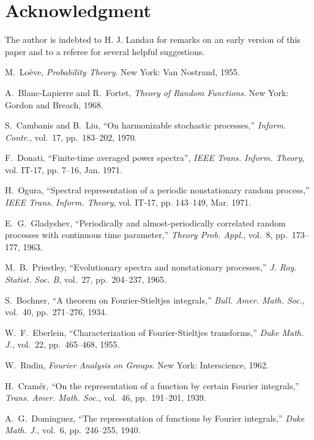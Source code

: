 \documentclass[11pt]{article}
\theoremstyle{plain}
\theoremstyle{definition}
\theoremstyle{remark}
\begin{document}
\section*{Acknowledgment}

The author is indebted to H. J. Landau for remarks on an early version of this paper and to a referee for several helpful suggestions.

\begin{thebibliography}{12}
M.~Loève, \emph{Probability Theory}. New York: Van Nostrand, 1955.

A.~Blanc-Lapierre and R.~Fortet, \emph{Theory of Random Functions}. New York: Gordon and Breach, 1968.

S.~Cambanis and B.~Liu, ``On harmonizable stochastic processes,'' \emph{Inform. Contr.}, vol.~17, pp.~183--202, 1970.

F.~Donati, ``Finite-time averaged power spectra'', \emph{IEEE Trans. Inform. Theory}, vol. IT-17, pp. 7--16, Jan. 1971.

H.~Ogura, ``Spectral representation of a periodic nonstationary random process,'' \emph{IEEE Trans. Inform. Theory}, vol. IT-17, pp. 143--149, Mar. 1971.

E.~G.~Gladyshev, ``Periodically and almost-periodically correlated random processes with continuous time parameter,'' \emph{Theory Prob. Appl.}, vol.~8, pp.~173--177, 1963.

M.~B.~Priestley, ``Evolutionary spectra and nonstationary processes,'' \emph{J. Roy. Statist. Soc. B}, vol.~27, pp.~204--237, 1965.

S.~Bochner, ``A theorem on Fourier-Stieltjes integrals,'' \emph{Bull. Amer. Math. Soc.}, vol.~40, pp.~271--276, 1934.

W.~F.~Eberlein, ``Characterization of Fourier-Stieltjes transforms,'' \emph{Duke Math. J.}, vol.~22, pp.~465--468, 1955.

W.~Rudin, \emph{Fourier Analysis on Groups}. New York: Interscience, 1962.

H.~Cramér, ``On the representation of a function by certain Fourier integrals,'' \emph{Trans. Amer. Math. Soc.}, vol.~46, pp.~191--201, 1939.

A.~G.~Dominguez, ``The representation of functions by Fourier integrals,'' \emph{Duke Math. J.}, vol.~6, pp.~246--255, 1940.
\end{thebibliography}
\end{document}

